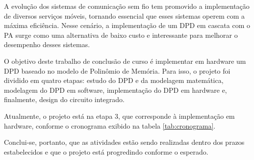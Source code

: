 A evolução dos sistemas de comunicação sem fio tem promovido a implementação de diversos serviços móveis, tornando essencial que esses sistemas operem com a máxima eficiência. Nesse cenário, a implementação de um DPD em cascata com o PA surge como uma alternativa de baixo custo e interessante para melhorar o desempenho desses sistemas.

O objetivo deste trabalho de conclusão de curso é implementar em hardware um DPD baseado no modelo de Polinômio de Memória. Para isso, o projeto foi dividido em quatro etapas: estudo do DPD e da modelagem matemática, modelagem do DPD em software, implementação do DPD em hardware e, finalmente, design do circuito integrado. 

Atualmente, o projeto está na etapa 3, que corresponde à implementação em hardware, conforme o cronograma exibido na tabela \ref{tab:cronograma}. 

Conclui-se, portanto, que as atividades estão sendo realizadas dentro dos prazos estabelecidos e que o projeto está progredindo conforme o esperado.
